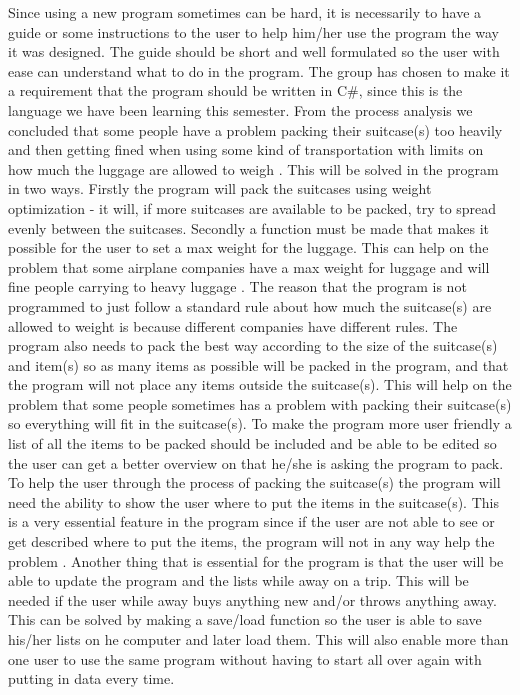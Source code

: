 Since using a new program sometimes can be hard, it is necessarily to have a guide or some instructions to the user to help him/her use the program the way it was designed. The guide should be short and well formulated so the user with ease can understand what to do in the program.
The group has chosen to make it a requirement that the program should be written in C\#, since this is the language we have been learning this semester.
From the process analysis  we concluded that some people have a problem packing their suitcase(s) too heavily and then getting fined when using some kind of transportation with limits on how much the luggage are allowed to weigh . 
This will be solved in the program in two ways. 
Firstly the program will pack the suitcases using weight optimization - it will, if more suitcases are available to be packed, try to spread evenly between the suitcases. 
Secondly a function must be made that makes it possible for the user to set a max weight for the luggage. This can help on the problem that some airplane companies have a max weight for luggage and will fine people carrying to heavy luggage . The reason that the program is not programmed to just follow a standard rule about how much the suitcase(s) are allowed to weight is because different companies have different rules.
The program also needs to pack the best way according to the size of the suitcase(s) and item(s) so as many items as possible will be packed in the program, and that the program will not place any items outside the suitcase(s). This will help on the problem that some people sometimes has a problem with packing their suitcase(s) so everything will fit in the suitcase(s).
To make the program more user friendly a list of all the items to be packed should be included and be able to be edited so the user can get a better overview on that he/she is asking the program to pack.
To help the user through the process of packing the suitcase(s) the program will need the ability to show the user where to put the items in the suitcase(s). This is a very essential feature in the program since if the user are not able to see or get described where to put the items, the program will not in any way help the problem .
Another thing that is essential for the program is that the user will be able to update the program and the lists while away on a trip. This will be needed if the user while away buys anything new and/or throws anything away. This can be solved by making a save/load function so the user is able to save his/her lists on he computer and later load them. This will also enable more than one user to use the same program without having to start all over again with putting in data every time.  

